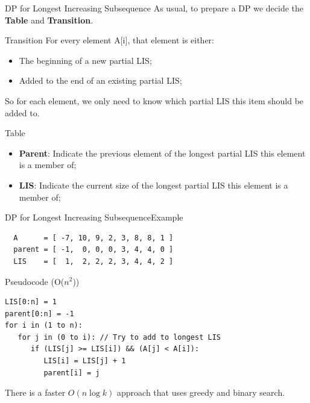 \begin{frame}{DP for Longest Increasing Subsequence}
  As usual, to prepare a DP we decide the {\bf Table} and {\bf Transition}.

  \begin{block}{Transition}
    For every element A[i], that element is either:
    \begin{itemize}
      \item The beginning of a new partial LIS;
      \item Added to the end of an existing partial LIS;
    \end{itemize}
    So for each element, we only need to know which partial LIS this item should be added to.
  \end{block}

  \begin{exampleblock}{Table}
    \begin{itemize}
      \item {\bf Parent}: Indicate the previous element of the longest partial LIS this element is a member of;
      \item {\bf LIS}: Indicate the current size of the longest partial LIS this element is a member of;
    \end{itemize}
  \end{exampleblock}
\end{frame}

\begin{frame}[fragile]{DP for Longest Increasing Subsequence}{Example}
\begin{verbatim}
  A      = [ -7, 10, 9, 2, 3, 8, 8, 1 ]
  parent = [ -1,  0, 0, 0, 3, 4, 4, 0 ]
  LIS    = [  1,  2, 2, 2, 3, 4, 4, 2 ]
\end{verbatim}

\begin{block}{Pseudocode (O($n^2$))}
\begin{verbatim}
LIS[0:n] = 1
parent[0:n] = -1
for i in (1 to n):
   for j in (0 to i): // Try to add to longest LIS
      if (LIS[j] >= LIS[i]) && (A[j] < A[i]):
         LIS[i] = LIS[j] + 1
         parent[i] = j
\end{verbatim}
\end{block}

There is a faster $O(n\log k)$ approach that uses greedy and binary search.
\end{frame}



